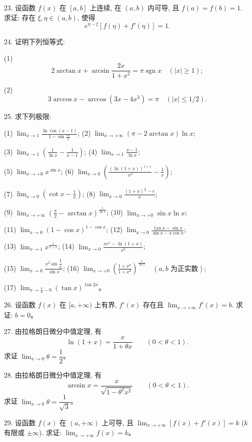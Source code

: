 \documentclass[UTF8, 12pt, fontset=fandol, oneside]{ctexart}
\begin{document}
23. 设函数 $f(x)$ 在 $[a,b]$ 上连续, 在 $(a,b)$ 内可导, 且 $f(a)=f(b)=1$. 求证: 存在 $\xi,\eta\in(a,b)$, 使得
\[
  e^{\eta-\xi}[f(\eta)+f'(\eta)]=1.
\]

24. 证明下列恒等式:

(1)
\[
  2\arctan x+\arcsin\frac{2x}{1+x^2}=\pi\operatorname{sgn}x\quad (|x|\ge1);
\]

(2)
\[
  3\arccos x-\arccos(3x-4x^3)=\pi\quad (|x|\le1/2).
\]

25. 求下列极限:

(1) $\displaystyle\lim_{x\to1}\frac{\ln\cos(x-1)}{1-\sin\frac{\pi x}2}$;\qquad
(2) $\displaystyle\lim_{x\to+\infty}(\pi-2\arctan x)\ln x$;

(3) $\displaystyle\lim_{x\to1}\left(\frac1{\ln x}-\frac1{x-1}\right)$;\qquad
(4) $\displaystyle\lim_{x\to1}\frac{x-1}{\ln x}$;

(5) $\displaystyle\lim_{x\to+0}x^{\sin x}$;\qquad
(6) $\displaystyle\lim_{x\to0}\left(\frac{(\ln(1+x))^{1+x}}{x^2}-\frac1x\right)$;

(7) $\displaystyle\lim_{x\to0}\left(\cot x-\frac1x\right)$;\qquad
(8) $\displaystyle\lim_{x\to0}\frac{(1+x)^{\frac1x}-e}{x}$;

(9) $\displaystyle\lim_{x\to+\infty}\left(\frac\pi2-\arctan x\right)^{\frac1{\ln x}}$;\qquad
(10) $\displaystyle\lim_{x\to+0}\sin x\ln x$;

(11) $\displaystyle\lim_{x\to0}(1-\cos x)^{1-\cos x}$;\qquad
(12) $\displaystyle\lim_{x\to0}\frac{\tan x-\sin x}{\sin x-x\cos x}$;

(13) $\displaystyle\lim_{x\to1}x^{\frac1{1-x}}$;\qquad
(14) $\displaystyle\lim_{x\to0}\frac{xe^x-\ln(1+x)}{x^2}$;

(15) $\displaystyle\lim_{x\to0}\frac{x^2\sin\dfrac1x}{\sin x}$;\qquad
(16) $\displaystyle\lim_{x\to+0}\left(\frac{1+x^a}{1+x^b}\right)^{\frac1{\ln x}}\quad (a,b\text{ 为正实数})$;

(17) $\displaystyle\lim_{x\to\frac\pi4-0}(\tan x)^{\tan 2x}$。

26. 设函数 $f(x)$ 在 $[a,+\infty)$ 上有界, $f'(x)$ 存在且 $\lim_{x\to+\infty}f'(x)=b$. 求证: $b=0$。

27. 由拉格朗日微分中值定理, 有
\[
  \ln(1+x)=\frac{x}{1+\theta x}\qquad (0<\theta<1).
\]
求证 $\lim_{x\to0}\theta=\dfrac12$。

28. 由拉格朗日微分中值定理, 有
\[
  \arcsin x=\frac{x}{\sqrt{1-\theta^2x^2}}\qquad (0<\theta<1).
\]
求证 $\lim_{x\to0}\theta=\dfrac1{\sqrt3}$。

29. 设函数 $f(x)$ 在 $(a,+\infty)$ 上可导, 且 $\lim_{x\to+\infty}[f(x)+f'(x)]=k$ ($k$ 有限或 $\pm\infty$). 求证: $\lim_{x\to+\infty}f(x)=k$。
\end{document}
